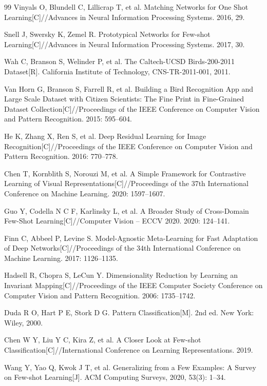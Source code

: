 \documentclass[UTF8,zihao=-4,scheme=chinese]{ctexart}
\begin{document}
\begin{thebibliography}{99}
  Vinyals O, Blundell C, Lillicrap T, et al. Matching Networks for One Shot Learning[C]//Advances in Neural Information Processing Systems. 2016, 29.

  Snell J, Swersky K, Zemel R. Prototypical Networks for Few-shot Learning[C]//Advances in Neural Information Processing Systems. 2017, 30.

  Wah C, Branson S, Welinder P, et al. The Caltech-UCSD Birds-200-2011 Dataset[R]. California Institute of Technology, CNS-TR-2011-001, 2011.

  Van Horn G, Branson S, Farrell R, et al. Building a Bird Recognition App and Large Scale Dataset with Citizen Scientists: The Fine Print in Fine-Grained Dataset Collection[C]//Proceedings of the IEEE Conference on Computer Vision and Pattern Recognition. 2015: 595--604.

  He K, Zhang X, Ren S, et al. Deep Residual Learning for Image Recognition[C]//Proceedings of the IEEE Conference on Computer Vision and Pattern Recognition. 2016: 770--778.

  Chen T, Kornblith S, Norouzi M, et al. A Simple Framework for Contrastive Learning of Visual Representations[C]//Proceedings of the 37th International Conference on Machine Learning. 2020: 1597--1607.

  Guo Y, Codella N C F, Karlinsky L, et al. A Broader Study of Cross-Domain Few-Shot Learning[C]//Computer Vision -- ECCV 2020. 2020: 124--141.

  Finn C, Abbeel P, Levine S. Model-Agnostic Meta-Learning for Fast Adaptation of Deep Networks[C]//Proceedings of the 34th International Conference on Machine Learning. 2017: 1126--1135.

  Hadsell R, Chopra S, LeCun Y. Dimensionality Reduction by Learning an Invariant Mapping[C]//Proceedings of the IEEE Computer Society Conference on Computer Vision and Pattern Recognition. 2006: 1735--1742.

  Duda R O, Hart P E, Stork D G. Pattern Classification[M]. 2nd ed. New York: Wiley, 2000.

  Chen W Y, Liu Y C, Kira Z, et al. A Closer Look at Few-shot Classification[C]//International Conference on Learning Representations. 2019.

  Wang Y, Yao Q, Kwok J T, et al. Generalizing from a Few Examples: A Survey on Few-shot Learning[J]. ACM Computing Surveys, 2020, 53(3): 1--34.
\end{thebibliography}
\end{document}
